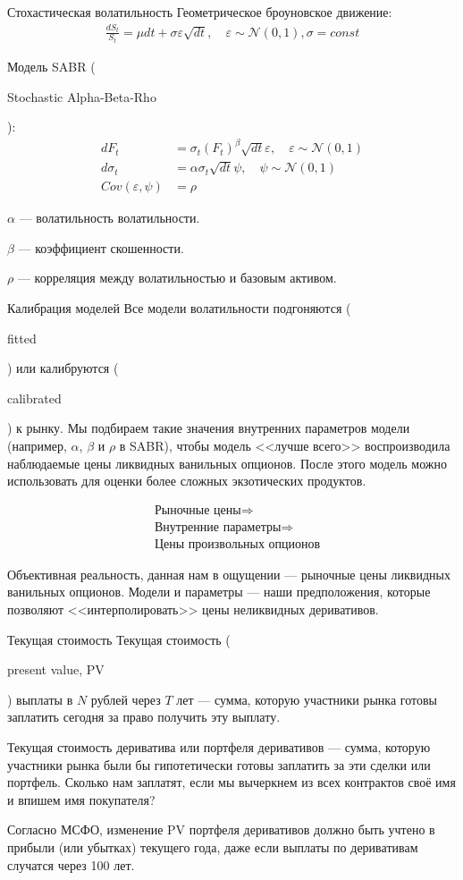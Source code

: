 \documentclass{beamer}
\newcommand{\en}[1]{\begin{otherlanguage}{english}#1\end{otherlanguage}}
\begin{document}
\begin{frame}{Стохастическая волатильность}
\justify
Геометрическое броуновское движение:
\begin{align*}
\frac{dS_t}{S_t} = \mu dt + \sigma\varepsilon\sqrt{dt}, \quad \varepsilon \sim \mathcal{N}(0, 1), \sigma = const
\end{align*}

\justify
Модель SABR (\en{Stochastic Alpha-Beta-Rho}):
\begin{align*}
dF_t &= \sigma_t(F_t)^\beta \sqrt{dt}\varepsilon, \quad \varepsilon \sim \mathcal{N}(0, 1) \\
d\sigma_t &= \alpha\sigma_t\sqrt{dt}\psi, \quad \psi \sim \mathcal{N}(0, 1) \\
Cov(\varepsilon, \psi) &= \rho
\end{align*}

\justify
$\alpha$ --- волатильность волатильности.

$\beta$ --- коэффициент скошенности.

$\rho$ --- корреляция между волатильностью и базовым активом.
\end{frame}



\begin{frame}{Калибрация моделей}
\justify
Все модели волатильности подгоняются (\en{fitted}) или калибруются (\en{calibrated}) к рынку. Мы подбираем такие значения внутренних параметров модели (например, $\alpha$, $\beta$ и $\rho$ в SABR), чтобы модель <<лучше всего>> воспроизводила наблюдаемые цены ликвидных ванильных опционов. После этого модель можно использовать для оценки более сложных экзотических продуктов.

\begin{align*}
&\text{Рыночные цены} \Rightarrow \\
&\text{Внутренние параметры} \Rightarrow \\
&\text{Цены произвольных опционов}
\end{align*}

\justify
Объективная реальность, данная нам в ощущении --- рыночные цены ликвидных ванильных опционов. Модели и параметры --- наши предположения, которые позволяют <<интерполировать>> цены неликвидных деривативов.
\end{frame}



\begin{frame}{Текущая стоимость}
\justify
Текущая стоимость (\en{present value, PV}) выплаты в $N$ рублей через $T$ лет 
--- сумма, которую участники рынка готовы заплатить сегодня за право получить эту 
выплату.

\justify
Текущая стоимость дериватива или портфеля деривативов --- сумма, которую участники рынка были бы гипотетически готовы заплатить за эти сделки или портфель. Сколько нам заплатят, если мы вычеркнем из всех контрактов своё имя и впишем имя покупателя?

\justify
Согласно МСФО, изменение PV портфеля деривативов должно быть учтено в прибыли (или убытках) текущего года, даже если выплаты по деривативам случатся через 100 лет.
\end{frame}
\end{document}
